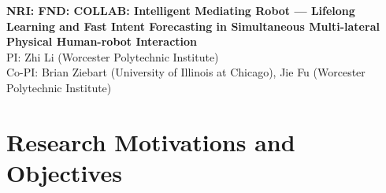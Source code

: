 \documentclass[letterpaper, 11 pt, onecolumn]{article}
\begin{document}
\setcounter{page}{1}

\pagebreak


\begin{center}
	{\large \bf NRI: FND: COLLAB: Intelligent Mediating Robot --- Lifelong Learning and Fast Intent Forecasting in Simultaneous Multi-lateral Physical Human-robot Interaction}\\
    \vspace{4pt}
   	PI: Zhi Li (Worcester Polytechnic Institute)\\
    Co-PI: Brian Ziebart (University of Illinois at Chicago), Jie Fu (Worcester Polytechnic Institute)
\end{center}

\vspace{-4pt}




\pagestyle{plain}
\setcounter{page}{1}




\section{Research Motivations and Objectives}\label{sec:intro}

\end{document}
